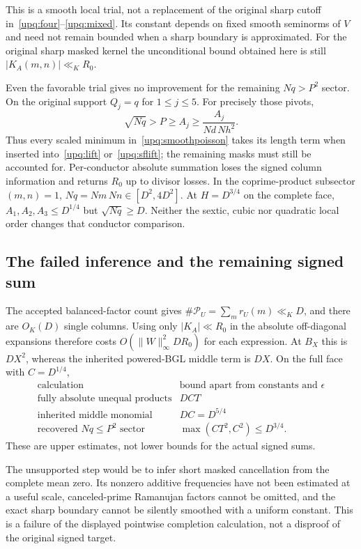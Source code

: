 This is a smooth local trial, not a replacement of the original sharp
cutoff in~\eqref{upq:four}--\eqref{upq:mixed}.
Its constant depends on fixed smooth seminorms of $V$ and need not remain
bounded when a sharp boundary is approximated. For the original sharp
masked kernel the unconditional bound obtained here is still
$|K_A(m,n)|\ll_KR_0$.

Even the favorable trial gives no improvement for the remaining
$Nq>P^2$ sector. On the original support $Q_j=q$ for $1\le j\le5$. For precisely those pivots,
\[
 \sqrt{Nq}>P\ge A_j\ge
       \frac{A_j}{Nd\,Nh^2}.
\]
Thus every scaled minimum in~\eqref{upq:smoothpoisson} takes its length
term when inserted into~\eqref{upq:lift} or~\eqref{upq:sflift};
the remaining masks must still be accounted for. Per-conductor
absolute summation loses the signed column information and returns
$R_0$ up to divisor losses. In the coprime-product subsector $(m,n)=1$,
$Nq=Nm\,Nn\in[D^2,4D^2]$. At $H=D^{3/4}$ on the complete face,
$A_1,A_2,A_3\le D^{1/4}$ but $\sqrt{Nq}\ge D$.
Neither the sextic, cubic nor quadratic local order changes that
conductor comparison.

\subsection{The failed inference and the remaining signed sum}
The accepted balanced-factor count gives
$\#\mathcal P_U=\sum_mr_U(m)\ll_KD$, and there are $O_K(D)$
single columns. Using only $|K_A|\ll R_0$ in the absolute off-diagonal
expansions therefore costs $O(\|W\|_\infty^2DR_0)$ for each expression.
At $B_X$ this is $DX^2$, whereas the inherited powered-BGL middle
term is $DX$. On the full face with $C=D^{1/4}$,
\[
 \begin{array}{c|c}
 \text{calculation}&\text{bound apart from constants and }\epsilon\\ \hline
 \text{fully absolute unequal products}&DCT\\
 \text{inherited middle monomial}&DC=D^{5/4}\\
 \text{recovered }Nq\le P^2\text{ sector}&
       \max(CT^2,C^2)\le D^{3/4}.
 \end{array}
\]
These are upper estimates, not lower bounds for the actual signed sums.

The unsupported step would be to infer short masked cancellation from
the complete mean zero. Its nonzero additive frequencies have not been
estimated at a useful scale, canceled-prime Ramanujan factors cannot be
omitted, and the exact sharp boundary cannot be silently smoothed with
a uniform constant. This is a failure of the displayed pointwise
completion calculation, not a disproof of the original signed target.

